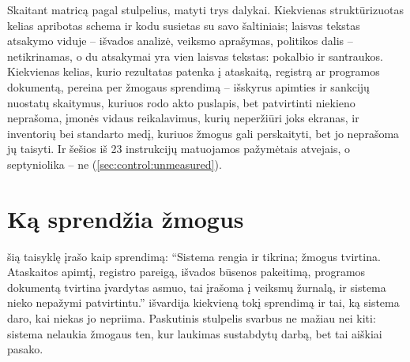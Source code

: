 Skaitant matricą pagal stulpelius, matyti trys dalykai. Kiekvienas struktūrizuotas kelias
apribotas schema ir kodu susietas su savo šaltiniais; laisvas tekstas atsakymo viduje --
išvados analizė, veiksmo aprašymas, politikos dalis -- netikrinamas, o du atsakymai yra vien
laisvas tekstas: pokalbio ir santraukos. Kiekvienas kelias, kurio rezultatas patenka į
ataskaitą, registrą ar programos dokumentą, pereina per žmogaus sprendimą -- išskyrus
apimties ir sankcijų nuostatų skaitymus, kuriuos rodo akto puslapis, bet patvirtinti niekieno
neprašoma, įmonės vidaus
reikalavimus, kurių neperžiūri joks ekranas, ir inventorių bei standarto medį, kuriuos žmogus
gali perskaityti, bet jo neprašoma jų taisyti. Ir šešios iš 23 instrukcijų matuojamos
pažymėtais atvejais, o septyniolika -- ne (\cref{sec:control:unmeasured}).


\section{Ką sprendžia žmogus}\label{sec:control:people}

 šią taisyklę įrašo kaip sprendimą: \enquote{Sistema rengia ir
tikrina; žmogus tvirtina. Ataskaitos apimtį, registro pareigą, išvados būsenos pakeitimą,
programos dokumentą tvirtina įvardytas asmuo, tai įrašoma į veiksmų žurnalą, ir sistema
nieko nepažymi patvirtintu.}  išvardija kiekvieną tokį sprendimą ir
tai, ką sistema daro, kai niekas jo nepriima. Paskutinis stulpelis svarbus ne mažiau nei kiti:
sistema nelaukia žmogaus ten, kur laukimas sustabdytų darbą, bet tai aiškiai pasako.


